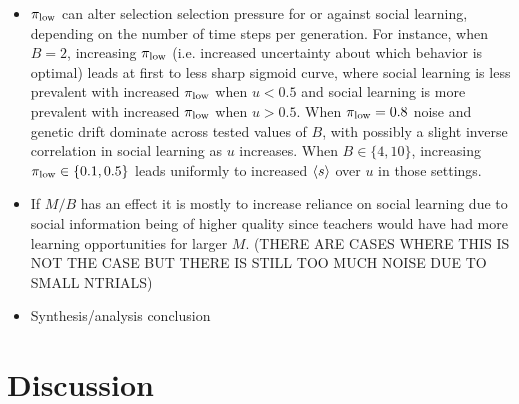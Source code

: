 \documentclass[letterpaper,11.5pt]{scrartcl}
\begin{document}
\begin{itemize}
  \item 
    $\pi_{\mathrm{low}}$ can alter selection selection pressure for or
    against social learning, depending on the number of time steps per generation.
    For instance, when $B=2$, increasing $\pi_{\mathrm{low}}$ (i.e. increased uncertainty
    about which behavior is optimal) leads at first to less sharp sigmoid curve, 
    where social learning is less prevalent with increased $\pi_{\mathrm{low}}$ when
    $u < 0.5$ and social learning is more prevalent with increased $\pi_{\mathrm{low}}$
    when $u > 0.5$. When $\pi_{\mathrm{low}} = 0.8$ noise and genetic drift dominate across
    tested values of $B$, with possibly a slight inverse correlation 
    in social learning as $u$ increases. When $B \in \{4,10\}$, increasing
    $\pi_{\mathrm{low}} \in \{0.1, 0.5\}$ leads uniformly to increased $\langle s \rangle$ over 
    $u$ in those settings.     

  \item
    If $M/B$ has an effect it is mostly to 
    increase reliance on social learning due to social information being of 
    higher quality since teachers would have had more learning opportunities
    for larger $M$. (THERE ARE CASES WHERE THIS IS NOT THE CASE BUT THERE IS 
    STILL TOO MUCH NOISE DUE TO SMALL NTRIALS)

  \item
    Synthesis/analysis conclusion 
    
\end{itemize}




\section{Discussion}




\setlength{\bibleftmargin}{.125in}
\setlength{\bibindent}{-\bibleftmargin}

% 

\end{document}
